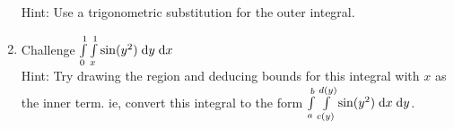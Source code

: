 \documentclass[letterpaper,11pt]{article}
\begin{document}
\begin{enumerate}
      Hint: Use a trigonometric substitution for the outer integral.\\
      \newline
      \newline
    \item Challenge $\int \limits_{0}^{1} \int \limits_{x}^{1} \sin(y^2) \;\mathrm{d}y \;\mathrm{d}x$\\
      Hint: Try drawing the region and deducing bounds for this integral with $x$ as the inner term.
      ie, convert this integral to the form $\int \limits_{a}^{b} \int \limits_{c(y)}^{d(y)} \sin(y^2) \;\mathrm{d}x \;\mathrm{d}y$.\\
      \newline
      \newline
  \end{enumerate}
\end{document}
